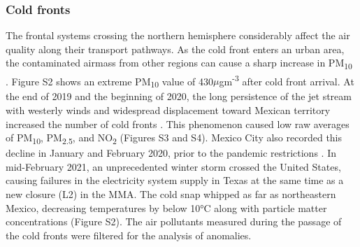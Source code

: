 \documentclass[sn-mathphys-num]{sn-jnl}
\begin{document}
\subsubsection{Cold fronts}
The frontal systems crossing the northern hemisphere considerably affect the air quality along their transport pathways. As the cold front enters an urban area, the contaminated airmass from other regions can cause a sharp increase in PM\textsubscript{10} \citep{Kang_2019}. Figure S2 shows an extreme PM\textsubscript{10} value of 430$\mu$gm\textsuperscript{-3} after cold front arrival. At the end of 2019 and the beginning of 2020, the long persistence of the jet stream with westerly winds and widespread displacement toward Mexican territory increased the number of cold fronts \citep{yucatn}. This phenomenon caused low raw averages of PM\textsubscript{10}, PM\textsubscript{2.5}, and NO\textsubscript{2} (Figures S3 and S4). Mexico City also recorded this decline in January and February 2020, prior to the pandemic restrictions \citep{Vega_2021}. In mid-February 2021, an unprecedented winter storm crossed the United States, causing failures in the electricity system supply in Texas \citep{Doss_Gollin_2021,years} at the same time as a new closure (L2) in the MMA. The cold snap whipped as far as northeastern Mexico, decreasing temperatures by below 10°C along with particle matter concentrations (Figure S2). The air pollutants measured during the passage of the cold fronts were filtered for the analysis of anomalies. 
\end{document}

